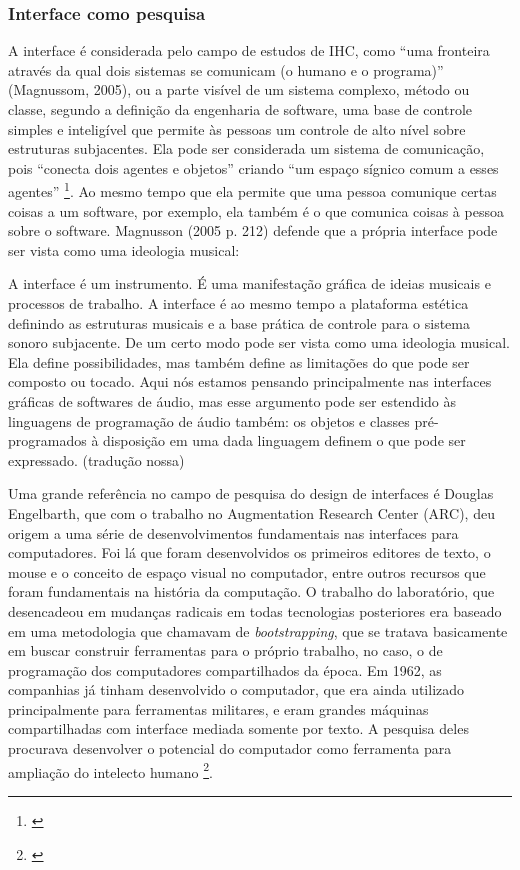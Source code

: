 \subsubsection{Interface como pesquisa}
A interface é considerada pelo campo de estudos de IHC, como “uma fronteira através da qual dois sistemas se comunicam (o humano e o programa)” (Magnussom, 2005), ou a parte visível de um sistema complexo, método ou classe, segundo a definição da engenharia de software, uma base de controle simples e inteligível que permite às pessoas um controle de alto nível sobre estruturas subjacentes. Ela pode ser considerada um sistema de comunicação, pois “conecta dois agentes e objetos” criando “um espaço sígnico comum a esses agentes” \footnote{\cite[105]{IAZZETTA1997}}. Ao mesmo tempo que ela permite que uma pessoa comunique certas coisas a um software, por exemplo, ela também é o que comunica coisas à pessoa sobre o software. Magnusson (2005 p. 212) defende que a própria interface pode ser vista como uma ideologia musical: 

\begin{citacao}
A interface é um instrumento. É uma manifestação gráfica de ideias musicais e processos de trabalho. A interface é ao mesmo tempo a plataforma estética definindo as estruturas musicais e a base prática de controle para o sistema sonoro subjacente. De um certo modo pode ser vista como uma ideologia musical. Ela define possibilidades, mas também define as limitações do que pode ser composto ou tocado. Aqui nós estamos pensando principalmente nas interfaces gráficas de softwares de áudio, mas esse argumento pode ser estendido às linguagens de programação de áudio também: os objetos e classes pré-programados à disposição em uma dada linguagem definem o que pode ser expressado. (tradução nossa)
\end{citacao}

Uma grande referência no campo de pesquisa do design de interfaces é Douglas Engelbarth, que com o trabalho no Augmentation Research Center (ARC), deu origem a uma série de desenvolvimentos fundamentais nas interfaces para computadores. Foi lá que foram desenvolvidos os primeiros editores de texto, o mouse e o conceito de espaço visual no computador, entre outros recursos que foram fundamentais na história da computação. O trabalho do laboratório, que desencadeou em mudanças radicais em todas tecnologias posteriores era baseado em uma metodologia que chamavam de \emph{bootstrapping}, que se tratava basicamente em buscar construir ferramentas para o próprio trabalho, no caso, o de programação dos computadores compartilhados da época. Em 1962, as companhias já tinham desenvolvido o computador, que era ainda utilizado principalmente para ferramentas militares, e eram grandes máquinas compartilhadas com interface mediada somente por texto. A pesquisa deles procurava desenvolver o potencial do computador como ferramenta para ampliação do intelecto humano \footnote{\cite{Engelbart1962}}.

